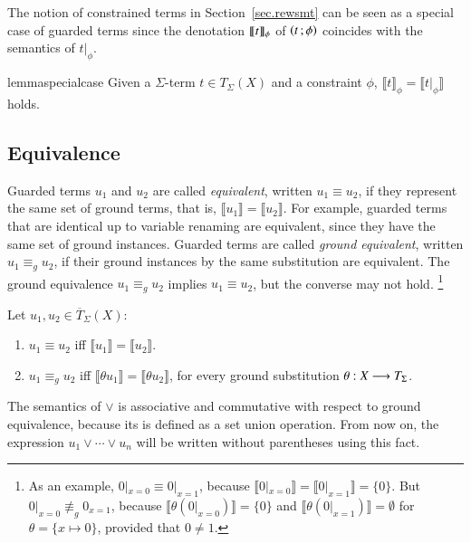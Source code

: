 The notion of constrained terms in Section~\ref{sec.rewsmt} can be
seen as a special case of guarded terms since the denotation
$\llbracket t \rrbracket_{\phi}$ of $\left( t \,; \phi \right)$ coincides with the semantics of
$t |_\phi$.

\begin{restatable}{lemma}{specialcase}
Given a $\Sigma$-term $t \in T_\Sigma(X)$ and a constraint $\phi$,
$\llbracket t \rrbracket_\phi = \llbracket t |_\phi \rrbracket$ holds.
\end{restatable}




\subsection{Equivalence}

Guarded terms $u_1$ and $u_2$ are called \emph{equivalent}, written
$u_1 \equiv u_2$, if they represent the same set of ground terms, that
is, $\llbracket u_1 \rrbracket = \llbracket u_2 \rrbracket$.  For
example, guarded terms that are identical up to variable renaming
are
equivalent, since they have the same set of ground instances.  Guarded
terms are called \emph{ground equivalent}, written $u_1 \equiv_g u_2$,
if their ground instances by the same substitution are equivalent.
The ground equivalence $u_1 \equiv_g u_2$ implies $u_1 \equiv u_2$,
but the converse may not hold.%
\footnote{
As an example, $0 |_{x = 0} \equiv 0|_{x
  = 1}$, because $\llbracket 0 |_{x = 0} \rrbracket = \llbracket 0
|_{x = 1} \rrbracket = \{0\}$.  But $0 |_{x = 0} \not\equiv_g 0_{x =
  1}$, because $\llbracket \theta(0 |_{x = 0}) \rrbracket = \{0\}$ and
$\llbracket \theta(0 |_{x = 1}) \rrbracket = \emptyset$ for $\theta =
\{x \mapsto 0\}$, provided that $0 \neq 1$.}


\begin{definition}
  Let $u_1, u_2 \in \overline{T}_{\Sigma}(X)$:
  \begin{enumerate}
  \item $u_1 \equiv u_2$ iff $\llbracket u_1 \rrbracket = \llbracket u_2 \rrbracket$.
  \item $u_1 \equiv_g u_2$ iff $\llbracket \theta u_1 \rrbracket =
    \llbracket \theta u_2 \rrbracket$, for every ground substitution
    $\theta : X \longrightarrow T_\Sigma$.
  \end{enumerate}
\end{definition}


The semantics of $\vee$ is associative and commutative with respect to
ground equivalence, because its is defined as a set union operation.
From now on, the expression $u_1 \vee \cdots \vee u_n$ will be written
without parentheses using this fact.


